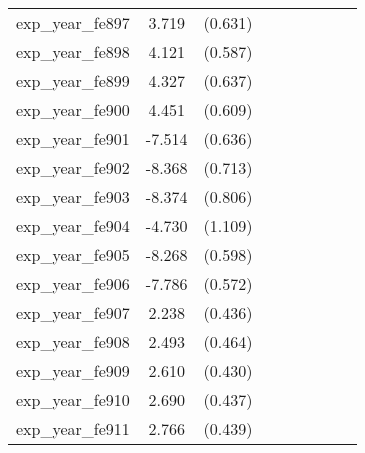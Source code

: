 {\begin{tabular}{l*{4}{cc}}
exp\_year\_fe897&    3.719\sym{***}&  (0.631)&                  &         &                  &         &                  &         \\
exp\_year\_fe898&    4.121\sym{***}&  (0.587)&                  &         &                  &         &                  &         \\
exp\_year\_fe899&    4.327\sym{***}&  (0.637)&                  &         &                  &         &                  &         \\
exp\_year\_fe900&    4.451\sym{***}&  (0.609)&                  &         &                  &         &                  &         \\
exp\_year\_fe901&   -7.514\sym{***}&  (0.636)&                  &         &                  &         &                  &         \\
exp\_year\_fe902&   -8.368\sym{***}&  (0.713)&                  &         &                  &         &                  &         \\
exp\_year\_fe903&   -8.374\sym{***}&  (0.806)&                  &         &                  &         &                  &         \\
exp\_year\_fe904&   -4.730\sym{***}&  (1.109)&                  &         &                  &         &                  &         \\
exp\_year\_fe905&   -8.268\sym{***}&  (0.598)&                  &         &                  &         &                  &         \\
exp\_year\_fe906&   -7.786\sym{***}&  (0.572)&                  &         &                  &         &                  &         \\
exp\_year\_fe907&    2.238\sym{***}&  (0.436)&                  &         &                  &         &                  &         \\
exp\_year\_fe908&    2.493\sym{***}&  (0.464)&                  &         &                  &         &                  &         \\
exp\_year\_fe909&    2.610\sym{***}&  (0.430)&                  &         &                  &         &                  &         \\
exp\_year\_fe910&    2.690\sym{***}&  (0.437)&                  &         &                  &         &                  &         \\
exp\_year\_fe911&    2.766\sym{***}&  (0.439)&                  &         &                  &         &                  &         \\

\end{tabular}}

